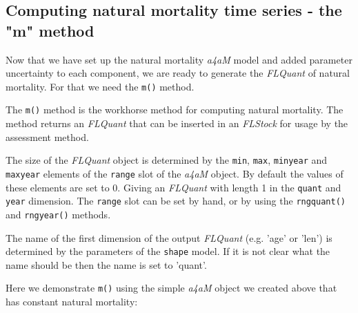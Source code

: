 \documentclass[a4paper,english,10pt]{article}\usepackage[]{graphicx}\usepackage[]{color}
\newcommand{\code}[1]{{\texttt{#1}}}
\newcommand{\class}[1]{{\textit{#1}}}
\begin{document}
\subsection{Computing natural mortality time series - the "m" method}

Now that we have set up the natural mortality \class{a4aM} model and added parameter uncertainty to each component, we are ready to generate the \class{FLQuant} of natural mortality. For that we need the \code{m()} method.

The \code{m()} method is the workhorse method for computing natural mortality. The method returns an \class{FLQuant} that can be inserted in an \class{FLStock} for usage by the assessment method.


The size of the \class{FLQuant} object is determined by the \code{min}, \code{max}, \code{minyear} and \code{maxyear} elements of the \code{range} slot of the \class{a4aM} object. By default the values of these elements are set to 0. Giving an \class{FLQuant} with length 1 in the \code{quant} and \code{year} dimension. The \code{range} slot can be set by hand, or by using the \code{rngquant()} and \code{rngyear()} methods.

The name of the first dimension of the output \class{FLQuant} (e.g. 'age' or 'len') is determined by the parameters of the \code{shape} model. If it is not clear what the name should be then the name is set to 'quant'.

Here we demonstrate \code{m()} using the simple \class{a4aM} object we created above that has constant natural mortality:
\end{document}
